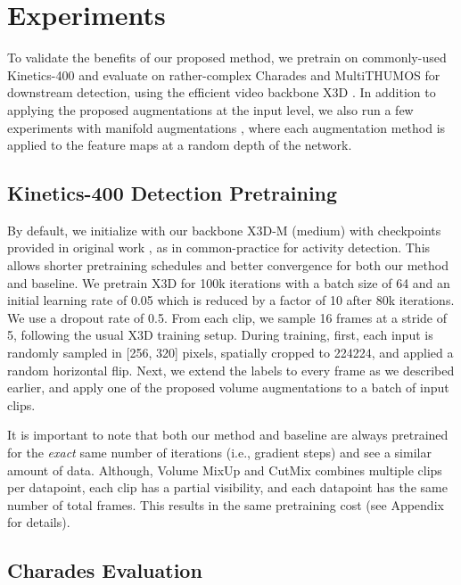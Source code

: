 \documentclass[letterpaper]{article} \usepackage{aaai23}  \usepackage{times}  \usepackage{helvet}  \usepackage{courier}  \usepackage[hyphens]{url}  \usepackage{graphicx} \urlstyle{rm} \def\UrlFont{\rm}  \usepackage{natbib}  \usepackage{caption} \frenchspacing  \setlength{\pdfpagewidth}{8.5in}  \setlength{\pdfpageheight}{11in}  \usepackage{algorithm}
\newcommand{\ch}{}
\begin{document}
\section{Experiments}
\label{sec:results}

To validate the benefits of our proposed method, we pretrain on commonly-used Kinetics-400 \cite{carreira2017quo} and evaluate on rather-complex Charades \cite{sigurdsson2016hollywood} and MultiTHUMOS \cite{yeung2018every} for downstream detection, using the efficient video backbone X3D \cite{feichtenhofer2020x3d}. In addition to applying the proposed augmentations at the input level, we also run a few experiments with manifold augmentations \cite{verma2019manifold}, where each augmentation method is applied to the feature maps at a random depth of the network.

\subsection{Kinetics-400 Detection Pretraining}


By default, we initialize with our backbone X3D-M (medium) with checkpoints provided in original work \cite{feichtenhofer2020x3d}, \ch{as in common-practice for activity detection. This allows shorter pretraining schedules and better convergence for both our method and baseline.} We pretrain X3D for 100k iterations with a batch size of 64 and an initial learning rate of 0.05 which is reduced by a factor of 10 after 80k iterations. We use a dropout rate of 0.5. From each clip, we sample 16 frames at a stride of 5, following the usual X3D training setup. During training, first, each input is randomly sampled in [256, 320] pixels, spatially cropped to 224224, and applied a random horizontal flip. Next, we extend the labels to every frame as we described earlier, and apply one of the proposed volume augmentations to a batch of input clips. 

\ch{It is important to note that both our method and baseline are always pretrained for the \textit{exact} same number of iterations (i.e., gradient steps) and see a similar amount of data. Although, Volume MixUp and CutMix combines multiple clips per datapoint, each clip has a partial visibility, and each datapoint has the same number of total frames. This results in the same pretraining cost (see Appendix for details).}

\subsection{Charades Evaluation}
\label{subsec:charades}
\end{document}
